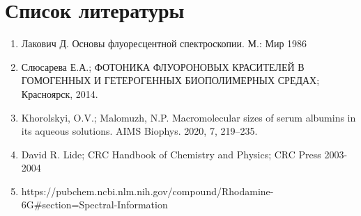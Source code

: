 \documentclass{article}
\begin{document}
    \section{Список литературы}
    \begin{enumerate}
        \item Лакович Д. Основы флуоресцентной спектроскопии. М.: Мир 1986
        \item Слюсарева Е.А.; ФОТОНИКА ФЛУОРОНОВЫХ КРАСИТЕЛЕЙ В ГОМОГЕННЫХ И ГЕТЕРОГЕННЫХ БИОПОЛИМЕРНЫХ СРЕДАХ; Красноярск, 2014.
        \item Khorolskyi, O.V.; Malomuzh, N.P. Macromolecular sizes of serum albumins in its aqueous solutions. AIMS Biophys. 2020, 7, 219–235.
        \item David R. Lide; CRC Handbook of Chemistry and Physics; CRC Press 2003-2004
        \item https://pubchem.ncbi.nlm.nih.gov/compound/Rhodamine-6G#section=Spectral-Information
    \end{enumerate}
\end{document}
